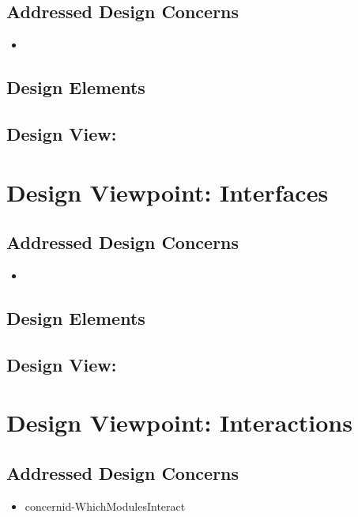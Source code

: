 \documentclass[onecolumn, draftclsnofoot,10pt, compsoc]{IEEEtran}
\begin{document}
    \subsection{Addressed Design Concerns}
        \begin{itemize}
            \item
        \end{itemize}

    \subsection{Design Elements}

    \subsection{Design View: }


\section{Design Viewpoint: Interfaces}
    \subsection{Addressed Design Concerns}
        \begin{itemize}
            \item
        \end{itemize}

    \subsection{Design Elements}

    \subsection{Design View: }


\section{Design Viewpoint: Interactions}
    \subsection{Addressed Design Concerns}
        \begin{itemize}
            \item concernid-WhichModulesInteract
        \end{itemize}
\end{document}
